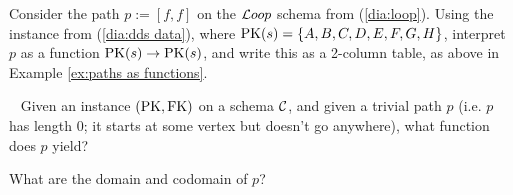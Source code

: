 \documentclass[CT4S-EN-RU]{subfiles}
\begin{document}
\begin{exampleRUS}\label{ex:paths as functions}
\end{exampleRUS}

\begin{exerciseENG}
Consider the path $p:=[f,f]$ on the ${\mathcal{L} oop}$ schema from (\ref{dia:loop}). Using the instance from (\ref{dia:dds data}), where $\textnormal{PK}(s)=\{A,B,C,D,E,F,G,H\}$, interpret $p$ as a function $\textnormal{PK}(s)\rightarrow\textnormal{PK}(s)$, and write this as a 2-column table, as above in Example \ref{ex:paths as functions}.
\end{exerciseENG}

\begin{exerciseRUS}
\end{exerciseRUS}

\begin{exerciseENG}~
\sexc Given an instance $(\textnormal{PK},\textnormal{FK})$ on a schema $\mathcal{C}$, and given a trivial path $p$ (i.e. $p$ has length 0; it starts at some vertex but doesn't go anywhere), what function does $p$ yield?
\item What are the domain and codomain of $p$?
\endsexc
\end{exerciseENG}

\begin{exerciseRUS}~
\end{exerciseRUS}
\end{document}
